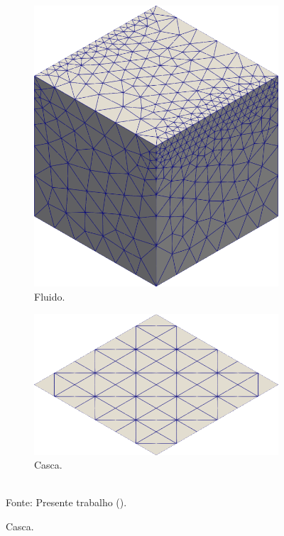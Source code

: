 \begin{figure}[h!]
    \centering
    \caption{Cavidade bidimensional - Malhas utilizadas para o segundo caso.}
    \begin{subfigure}[b]{0.4\textwidth}
        \includegraphics[width=\linewidth]{Figuras/FSI-Cavity2D/fluid-coarse.png}
        \caption{Fluido.}
    \end{subfigure}
    \begin{subfigure}[b]{0.4\textwidth}
        \includegraphics[width=\linewidth]{Figuras/FSI-Cavity2D/shell-coarse.png}
        \caption{Casca.}
    \end{subfigure}
    \\Fonte: Presente trabalho (\the\year).
    \label{fig:cavity2D-coarse}
\end{figure}

